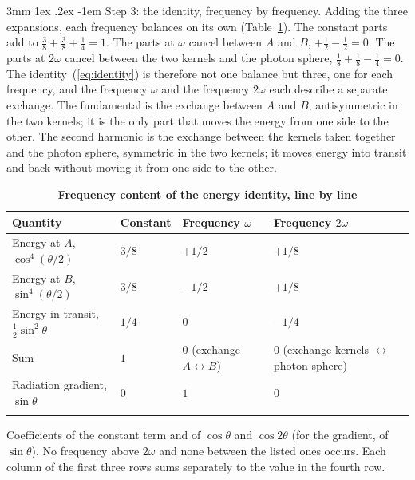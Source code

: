 \documentclass[%
 reprint, amsmath,amssymb, aps, prb, ]{revtex4-2}
\makeatletter
\numberwithin{equation}{section}
\renewcommand\paragraph{%
  \@startsection{paragraph}{4}{\z@}%
    {3mm \@plus 1ex \@minus .2ex}%
    {-1em}%
    {\normalfont\normalsize\itshape}}
\makeatother
\begin{document}
\paragraph{Step 3: the identity, frequency by frequency.} Adding the three expansions, each frequency balances on its own (Table~\ref{tab:lines}). The constant parts add to $\tfrac38 + \tfrac38 + \tfrac14 = 1$. The parts at $\omega$ cancel between $A$ and $B$, $+\tfrac12 - \tfrac12 = 0$. The parts at $2\omega$ cancel between the two kernels and the photon sphere, $\tfrac18 + \tfrac18 - \tfrac14 = 0$. The identity~(\ref{eq:identity}) is therefore not one balance but three, one for each frequency, and the frequency $\omega$ and the frequency $2\omega$ each describe a separate exchange. The fundamental is the exchange between $A$ and $B$, antisymmetric in the two kernels; it is the only part that moves the energy from one side to the other. The second harmonic is the exchange between the kernels taken together and the photon sphere, symmetric in the two kernels; it moves energy into transit and back without moving it from one side to the other.

\begin{table}[t!]
\centering
\caption{\textbf{Frequency content of the energy identity, line by line}}
\label{tab:lines}
\renewcommand{\arraystretch}{1.4}
\begin{tabular}{p{5.0cm}p{2.8cm}p{2.8cm}p{4.9cm}}
\toprule
\textbf{Quantity} & \textbf{Constant} & \textbf{Frequency $\omega$} & \textbf{Frequency $2\omega$} \\
\midrule
Energy at $A$, $\cos^4(\theta/2)$
& $3/8$
& $+1/2$
& $+1/8$ \\
\addlinespace[0.3cm]
Energy at $B$, $\sin^4(\theta/2)$
& $3/8$
& $-1/2$
& $+1/8$ \\
\addlinespace[0.3cm]
Energy in transit, $\tfrac12\sin^2\theta$
& $1/4$
& $0$
& $-1/4$ \\
\addlinespace[0.3cm]
Sum
& $1$
& $0$ (exchange $A \leftrightarrow B$)
& $0$ (exchange kernels $\leftrightarrow$ photon sphere) \\
\addlinespace[0.3cm]
Radiation gradient, $\sin\theta$
& $0$
& $1$
& $0$ \\
\addlinespace[0.2cm]
\bottomrule
\end{tabular}
\vspace{0.2cm}
\begin{minipage}{0.95\textwidth}
\justifying\footnotesize
Coefficients of the constant term and of $\cos\theta$ and $\cos2\theta$ (for the gradient, of $\sin\theta$). No frequency above $2\omega$ and none between the listed ones occurs. Each column of the first three rows sums separately to the value in the fourth row.
\end{minipage}
\end{table}
\end{document}
